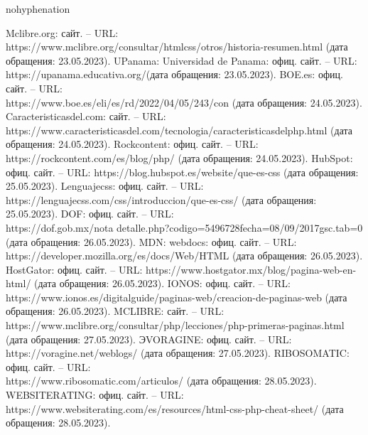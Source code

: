 \newsection
{}

\begin{hyphenrules}{nohyphenation} %
  \begin{thebibliography}{9}

     Mclibre.org: сайт. – URL: https://www.mclibre.org/consultar/htmlcss/otros/historia-resumen.html (дата обращения: 23.05.2023).
     UPanama: Universidad de Panama: офиц. сайт. – URL: https://upanama.educativa.org/(дата обращения: 23.05.2023).
     BOE.es: офиц. сайт. – URL:\\    https://www.boe.es/eli/es/rd/2022/04/05/243/con (дата обращения: 24.05.2023).
     Caracteristicasdel.com: сайт. – URL: \\https://www.caracteristicasdel.com/tecnologia/caracteristicasdelphp.html (дата обращения: 24.05.2023).
     Rockcontent: офиц. сайт. – URL: https://rockcontent.com/es/blog/php/ (дата обращения: 24.05.2023).
     HubSpot: офиц. сайт. – URL: https://blog.hubspot.es/website/que-es-css (дата обращения: 25.05.2023).
     Lenguajecss: офиц. сайт. – URL: https://lenguajecss.com/css/introduccion/que-es-css/ 
    (дата обращения: 25.05.2023).
     DOF: офиц. сайт. – URL: \\https://dof.gob.mx/nota detalle.php?codigo=5496728fecha=08/09/2017gsc.tab=0 
    (дата обращения: 26.05.2023).
     MDN: webdocs: офиц. сайт. – URL: \\https://developer.mozilla.org/es/docs/Web/HTML (дата обращения: 26.05.2023).
     HostGator: офиц. сайт. – URL: https://www.hostgator.mx/blog/pagina-web-en-html/ (дата обращения: 26.05.2023).
     IONOS: офиц. сайт. – URL: https://www.ionos.es/digitalguide/paginas-web/creacion-de-paginas-web (дата обращения: 26.05.2023).
   	 MCLIBRE: сайт. – URL: https://www.mclibre.org/consultar/php/lecciones/php-primeras-paginas.html (дата обращения: 27.05.2023).
     ЭVORAGINE: офиц. сайт. – URL: https://voragine.net/weblogs/ (дата обращения: 27.05.2023).
     RIBOSOMATIC: офиц. сайт. – URL: \\https://www.ribosomatic.com/articulos/ (дата обращения: 28.05.2023).
     WEBSITERATING: офиц. сайт. – URL: \\https://www.websiterating.com/es/resources/html-css-php-cheat-sheet/ (дата обращения: 28.05.2023).

\end{thebibliography}
\end{hyphenrules}
